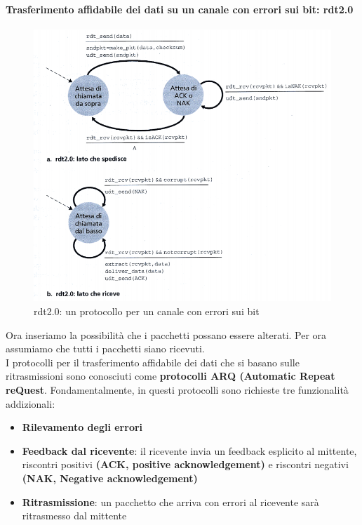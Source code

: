 \documentclass[11pt,a4paper]{book}
\begin{document}
\paragraph{Trasferimento affidabile dei dati su un canale con errori sui bit: rdt2.0} \label{par: numSequenza}
\begin{figure}
	\includegraphics[scale=0.6]{img/018.png}
	\caption{rdt2.0: un protocollo per un canale con errori sui bit}
\end{figure}
Ora inseriamo la possibilità che i pacchetti possano essere alterati. Per ora assumiamo che tutti i pacchetti siano ricevuti.\\
I protocolli per il trasferimento affidabile dei dati che si basano sulle ritrasmissioni sono conosciuti come \textbf{protocolli ARQ (Automatic Repeat reQuest}. Fondamentalmente, in questi protocolli sono richieste tre funzionalità addizionali:
\begin{itemize}
	\item \textbf{Rilevamento degli errori}
	\item \textbf{Feedback dal ricevente}: il ricevente invia un feedback esplicito al mittente,  riscontri positivi \textbf{(ACK, positive acknowledgement)} e riscontri negativi \textbf{(NAK, Negative acknowledgement)}
	\item \textbf{Ritrasmissione}: un pacchetto che arriva con errori al ricevente sarà ritrasmesso dal mittente
\end{itemize}
\end{document}
